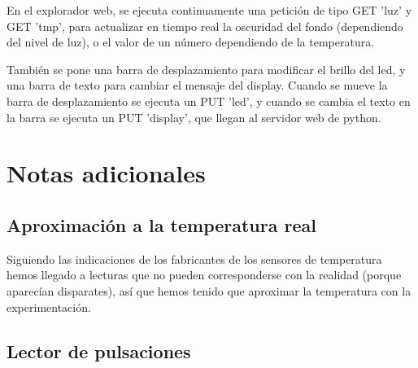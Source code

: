 \documentclass[]{article}
\begin{document}
En el explorador web, se ejecuta continuamente una petición de tipo GET 'luz' y GET 'tmp', para actualizar en tiempo real la oscuridad del fondo (dependiendo del nivel de luz), o el valor de un número dependiendo de la temperatura.

\hfill

También se pone una barra de desplazamiento para modificar el brillo del led, y una barra de texto para cambiar el mensaje del display. Cuando se mueve la barra de desplazamiento se ejecuta un PUT 'led', y cuando se cambia el texto en la barra se ejecuta un PUT 'display', que llegan al servidor web de python.



\section{Notas adicionales}

\subsection{Aproximación a la temperatura real}
Siguiendo las indicaciones de los fabricantes de los sensores de temperatura hemos llegado a lecturas que no pueden corresponderse con la realidad (porque aparecían disparates), así que hemos tenido que aproximar la temperatura con la experimentación.


\subsection{Lector de pulsaciones}
\end{document}
